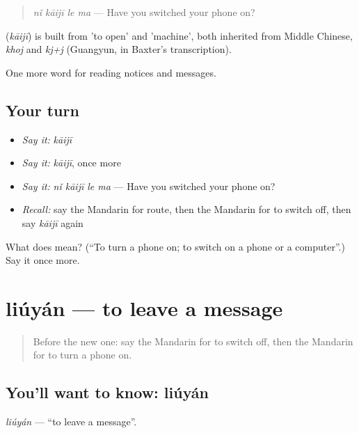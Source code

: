 \begin{quote}
\textbf{} \emph{nǐ kāijī le ma} — Have you switched your phone on?
\end{quote}

\begin{cousinweb}
\textbf{} (\emph{kāijī}) is built from  'to open' and  'machine', both inherited from Middle Chinese, \emph{khoj} and \emph{kj+j} (Guangyun, in Baxter's transcription).
\end{cousinweb}

\begin{grammarlens}[title={What you've built}]
One more word for reading notices and messages.
\end{grammarlens}

\subsection*{Your turn}
\begin{itemize}
\raggedright
  \item \emph{Say it:} \emph{kāijī}
  \item \emph{Say it:} \emph{kāijī}, once more
  \item \emph{Say it:} \emph{nǐ kāijī le ma} — Have you switched your phone on?
  \item \emph{Recall:} say the Mandarin for route, then the Mandarin for to switch off, then say \emph{kāijī} again
\end{itemize}

\begin{tcolorbox}[breakable,colback=teal!4,colframe=teal!35!black,title={Before you move on}]
What does  mean? (\textquotedblleft{}To turn a phone on; to switch on a phone or a computer\textquotedblright{}.) Say it once more.
\end{tcolorbox}
\section[liúyán]{liúyán — to leave a message}

\label{lesson:ZH-C198-liuyan}



\begin{quote}
Before the new one: say the Mandarin for to switch off, then the Mandarin for to turn a phone on.
\end{quote}

\subsection*{You'll want to know: liúyán}
\emph{liúyán} — \textquotedblleft{}to leave a message\textquotedblright{}.

